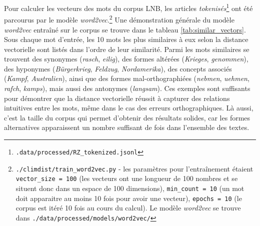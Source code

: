 \documentclass[a4paper,twoside,12pt]{article}
\begin{document}
Pour calculer les vecteurs des mots du corpus LNB, les articles \textit{tokenisés}\footnote{\texttt{.data/processed/RZ\_tokenized.jsonl}} ont été parcourus par le modèle \textit{word2vec}.\footnote{\texttt{./climdist/train\_word2vec.py} - les paramètres pour l'entraînement étaient \texttt{vector\_size = 100} (les vecteurs ont une longueur de 100 nombres et se situent donc dans un espace de 100 dimensions), \texttt{min\_count = 10} (un mot doit apparaitre au moins 10 fois pour avoir une vecteur), \texttt{epochs = 10} (le corpus est itéré 10 fois au cours du calcul). Le modèle \textit{word2vec} se trouve dans \texttt{./data/processed/models/word2vec/}} Une démonstration générale du modèle \textit{word2vec} entraîné sur le corpus se trouve dans le tableau \ref{tab:similar_vectors}. Sous chaque mot d'entrée, les 10 mots les plus similaires à eux selon la distance vectorielle sont listés dans l'ordre de leur similarité. Parmi les mots similaires se trouvent des synonymes (\textit{rasch}, \textit{eilig}), des formes altérées (\textit{Krieges}, \textit{genommen}), des hyponymes (\textit{Bürgerkrieg}, \textit{Feldzug}, \textit{Nordamerika}), des concepts associés (\textit{Kampf}, \textit{Australien}), ainsi que des formes mal-orthographiées (\textit{nebmen}, \textit{uehmen}, \textit{rafch}, \textit{kamps}), mais aussi des antonymes (\textit{langsam}). Ces exemples sont suffisants pour démontrer que la distance vectorielle réussit à capturer des relations intuitives entre les mots, même dans le cas des erreurs orthographiques. Là aussi, c'est la taille du corpus qui permet d'obtenir des résultats solides, car les formes alternatives apparaissent un nombre suffisant de fois dans l'ensemble des textes.
\end{document}

